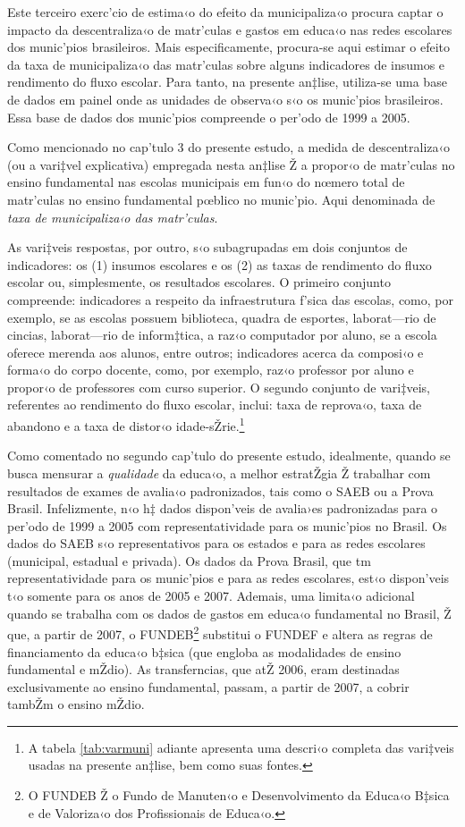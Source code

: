 \documentclass[a4paper, 12pt]{article}
\begin{document}
Este terceiro exerc’cio de estima‹o do efeito da municipaliza‹o procura captar o impacto da descentraliza‹o de matr’culas e gastos em educa‹o nas redes escolares dos munic’pios brasileiros. Mais especificamente, procura-se aqui estimar o efeito da taxa de municipaliza‹o das matr’culas sobre alguns indicadores de insumos e rendimento do fluxo escolar. Para tanto, na presente an‡lise, utiliza-se uma base de dados em painel onde as unidades de observa‹o s‹o os munic’pios brasileiros. Essa base de dados dos munic’pios compreende o per’odo de 1999 a 2005.

Como mencionado no cap’tulo 3 do presente estudo, a medida de descentraliza‹o (ou a vari‡vel explicativa) empregada nesta an‡lise Ž a propor‹o de matr’culas no ensino fundamental nas escolas municipais  em fun‹o do nœmero total de matr’culas no ensino fundamental pœblico no munic’pio. Aqui denominada de \emph{taxa de municipaliza‹o das matr’culas}. 

As vari‡veis respostas, por outro, s‹o subagrupadas em dois conjuntos de indicadores: os (1) insumos escolares e os (2) as taxas de rendimento do fluxo escolar ou, simplesmente, os resultados escolares. O primeiro conjunto compreende: indicadores a respeito da infraestrutura  f’sica das escolas, como, por exemplo, se as escolas possuem biblioteca, quadra de esportes, laborat—rio de cincias, laborat—rio de inform‡tica, a raz‹o computador por aluno, se a escola oferece merenda aos alunos, entre outros; indicadores acerca da composi‹o e forma‹o do corpo docente, como, por exemplo, raz‹o professor por aluno e propor‹o de professores com curso superior. O segundo conjunto de vari‡veis, referentes ao rendimento do fluxo escolar, inclui: taxa de reprova‹o, taxa de abandono e a taxa de distor‹o idade-sŽrie.\footnote{A tabela \ref{tab:varmuni} adiante apresenta uma descri‹o completa das vari‡veis usadas na presente an‡lise, bem como suas fontes.}

Como comentado no segundo cap’tulo do presente estudo, idealmente, quando se busca mensurar a \emph{qualidade} da educa‹o, a melhor estratŽgia Ž trabalhar com resultados de exames de avalia‹o padronizados, tais como o SAEB ou a Prova Brasil. Infelizmente, n‹o h‡ dados dispon’veis de avalia›es padronizadas para o per’odo de 1999 a 2005 com representatividade para os munic’pios no Brasil. Os dados do SAEB s‹o representativos para os estados e para as redes escolares (municipal, estadual e privada). Os dados da Prova Brasil, que tm representatividade para os munic’pios e para as redes escolares, est‹o dispon’veis t‹o somente para os anos de 2005 e 2007. Ademais, uma limita‹o adicional quando se trabalha com os dados de gastos em educa‹o fundamental no Brasil, Ž que, a partir de 2007, o FUNDEB\footnote{O FUNDEB Ž o Fundo de Manuten‹o e Desenvolvimento da Educa‹o B‡sica e de Valoriza‹o dos Profissionais de Educa‹o.} substitui o FUNDEF e altera as regras de financiamento da educa‹o b‡sica (que engloba as modalidades de ensino fundamental e mŽdio). As transferncias, que atŽ 2006, eram destinadas exclusivamente ao ensino fundamental, passam, a partir de 2007, a cobrir tambŽm o ensino mŽdio.
\end{document}
